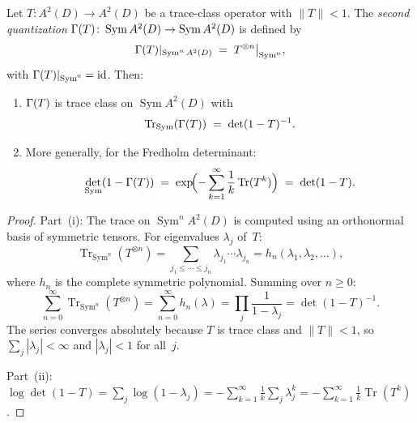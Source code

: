 \begin{proposition}%
\label{prop:thqg-X-second-quantization}%
%
Let $T \colon A^2(D) \to A^2(D)$ be a trace-class operator
with $\|T\| < 1$. The \emph{second quantization}
$\Gamma(T) \colon \operatorname{Sym} A^2(D) \to
\operatorname{Sym} A^2(D)$ is defined by
\begin{equation}%
\secquant(T)|_{\operatorname{Sym}^n A^2(D)}
\;=\;
T^{\otimes n}\big|_{\operatorname{Sym}^n},
\end{equation}
with $\Gamma(T)|_{\operatorname{Sym}^0} = \mathrm{id}$.
Then:
\begin{enumerate}[label=\textup{(\roman*)}]
\item $\Gamma(T)$ is trace class on $\operatorname{Sym} A^2(D)$
 with
 \begin{equation}%
 \operatorname{Tr}_{\operatorname{Sym}}(\secquant(T))
 \;=\;
 \det(1 - T)^{-1}.
 \end{equation}
\item More generally, for the Fredholm determinant:
 \begin{equation}%
 \det_{\operatorname{Sym}}(1 - \secquant(T))
 \;=\;
 \exp\!\Bigl(-\sum_{k=1}^{\infty}
 \frac{1}{k}\operatorname{Tr}(T^k)\Bigr)
 \;=\;
 \det(1 - T).
 \end{equation}
\end{enumerate}
\end{proposition}

\begin{proof}
Part~(i): The trace on $\operatorname{Sym}^n A^2(D)$ is computed
using an orthonormal basis of symmetric tensors.
For eigenvalues $\lambda_j$ of~$T$:
\[
\operatorname{Tr}_{\operatorname{Sym}^n}(T^{\otimes n})
= \sum_{j_1 \leq \cdots \leq j_n}
\lambda_{j_1} \cdots \lambda_{j_n}
= h_n(\lambda_1, \lambda_2, \ldots),
\]
where $h_n$ is the complete symmetric polynomial.
Summing over $n \geq 0$:
\[
\sum_{n=0}^{\infty}
\operatorname{Tr}_{\operatorname{Sym}^n}(T^{\otimes n})
= \sum_{n=0}^{\infty} h_n(\lambda)
= \prod_{j} \frac{1}{1 - \lambda_j}
= \det(1 - T)^{-1}.
\]
The series converges absolutely because $T$ is trace class
and $\|T\| < 1$, so $\sum_j |\lambda_j| < \infty$ and
$|\lambda_j| < 1$ for all~$j$.

Part~(ii): $\log\det(1-T) = \sum_j \log(1-\lambda_j)
= -\sum_{k=1}^{\infty} \frac{1}{k}\sum_j \lambda_j^k
= -\sum_{k=1}^{\infty} \frac{1}{k}\operatorname{Tr}(T^k)$.
\end{proof}


